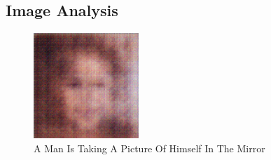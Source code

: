 \documentclass{article}%
\begin{document}
%
\subsection{Image Analysis}%
\label{subsec:ImageAnalysis}%


\begin{figure}[h!]%
\centering%
\includegraphics[width=150px]{500_fake_images/samples_5_303.png}%
\caption{A Man Is Taking A Picture Of Himself In The Mirror}%
\end{figure}

%
\end{document}
